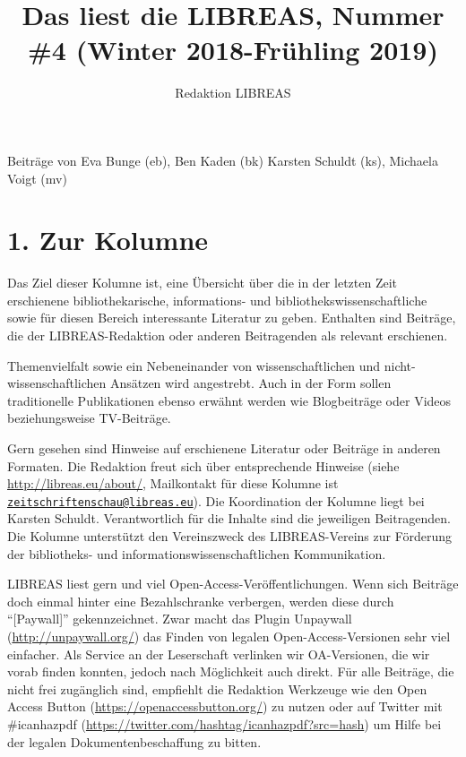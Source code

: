 \documentclass[a4paper,
fontsize=11pt,
oneside,
numbers=noperiodatend,
parskip=half-,
bibliography=totoc,
final
]{scrartcl}
\title{\LARGE{Das liest die LIBREAS, Nummer \#4 (Winter 2018-Frühling 2019)}} %
\author{Redaktion LIBREAS} %
\date{}
\begin{document}
\maketitle
\thispagestyle{fancyplain} 


Beiträge von Eva Bunge (eb), Ben Kaden (bk) Karsten Schuldt (ks),
Michaela Voigt (mv)

\hypertarget{zur-kolumne}{%
\section{1. Zur Kolumne}\label{zur-kolumne}}

Das Ziel dieser Kolumne ist, eine Übersicht über die in der letzten Zeit
erschienene bibliothekarische, informations- und
bibliothekswissenschaftliche sowie für diesen Bereich interessante
Literatur zu geben. Enthalten sind Beiträge, die der LIBREAS-Redaktion
oder anderen Beitragenden als relevant erschienen.

Themenvielfalt sowie ein Nebeneinander von wissenschaftlichen und
nicht-wissenschaftlichen Ansätzen wird angestrebt. Auch in der Form
sollen traditionelle Publikationen ebenso erwähnt werden wie
Blogbeiträge oder Videos beziehungsweise TV-Beiträge.

Gern gesehen sind Hinweise auf erschienene Literatur oder Beiträge in
anderen Formaten. Die Redaktion freut sich über entsprechende Hinweise
(siehe \url{http://libreas.eu/about/}, Mailkontakt für diese Kolumne ist
\href{mailto:zeitschriftenschau@libreas.eu}{\nolinkurl{zeitschriftenschau@libreas.eu}}).
Die Koordination der Kolumne liegt bei Karsten Schuldt. Verantwortlich
für die Inhalte sind die jeweiligen Beitragenden. Die Kolumne
unterstützt den Vereinszweck des LIBREAS-Vereins zur Förderung der
bibliotheks- und informationswissenschaftlichen Kommunikation.

LIBREAS liest gern und viel Open-Access-Veröffentlichungen. Wenn sich
Beiträge doch einmal hinter eine Bezahlschranke verbergen, werden diese
durch \enquote{{[}Paywall{]}} gekennzeichnet. Zwar macht das Plugin
Unpaywall (\url{http://unpaywall.org/}) das Finden von legalen
Open-Access-Versionen sehr viel einfacher. Als Service an der
Leserschaft verlinken wir OA-Versionen, die wir vorab finden konnten,
jedoch nach Möglichkeit auch direkt. Für alle Beiträge, die nicht frei
zugänglich sind, empfiehlt die Redaktion Werkzeuge wie den Open Access
Button (\url{https://openaccessbutton.org/}) zu nutzen oder auf Twitter
mit \#icanhazpdf (\url{https://twitter.com/hashtag/icanhazpdf?src=hash})
um Hilfe bei der legalen Dokumentenbeschaffung zu bitten.
\end{document}

